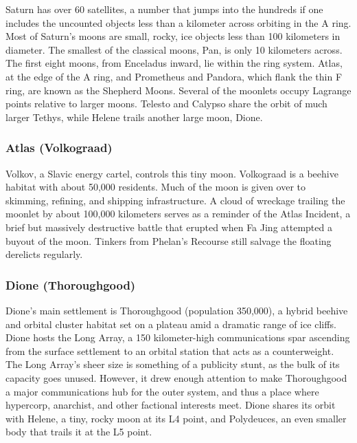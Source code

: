 
Saturn has over 60 satellites, a number that jumps into the hundreds if one includes the uncounted objects less than a kilometer across orbiting in the A ring. Most of Saturn’s moons are small, rocky, ice objects less than 100 kilometers in diameter. The smallest of the classical moons, Pan, is only 10 kilometers across. The first eight moons, from Enceladus inward, lie within the ring system. Atlas, at the edge of the A ring, and Prometheus and Pandora, which flank the thin F ring, are known as the Shepherd Moons. Several of the moonlets occupy Lagrange points relative to larger moons. Telesto and Calypso share the orbit of much larger Tethys, while Helene trails another large moon, Dione. 

\subsubsection{Atlas (Volkograad)}
\label{sec:atlas-volkograad} 

Volkov, a Slavic energy cartel, controls this tiny moon. Volkograad is a beehive habitat with about 50,000 residents. Much of the moon is given over to skimming, refining, and shipping infrastructure. A cloud of wreckage trailing the moonlet by about 100,000 kilometers serves as a reminder of the Atlas Incident, a brief but massively destructive battle that erupted when Fa Jing attempted a buyout of the moon. Tinkers from Phelan’s Recourse still salvage the floating derelicts regularly. 

\subsubsection{Dione (Thoroughgood)}
\label{sec:dione-thoroughgood} 

Dione’s main settlement is Thoroughgood (population 350,000), a hybrid beehive and orbital cluster habitat set on a plateau amid a dramatic range of ice cliffs. Dione hosts the Long Array, a 150 kilometer-high communications spar ascending from the surface settlement to an orbital station that acts as a counterweight. The Long Array’s sheer size is something of a publicity stunt, as the bulk of its capacity goes unused. However, it drew enough attention to make Thoroughgood a major communications hub for the outer system, and thus a place where hypercorp, anarchist, and other factional interests meet. Dione shares its orbit with Helene, a tiny, rocky moon at its L4 point, and Polydeuces, an even smaller body that trails it at the L5 point. 

